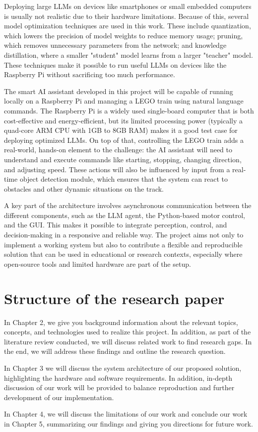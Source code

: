 Deploying large LLMs on devices like smartphones or small embedded computers is usually not realistic due to their hardware limitations. Because of this, several model optimization techniques are used in this work. These include quantization, which lowers the precision of model weights to reduce memory usage; pruning, which removes unnecessary parameters from the network; and knowledge distillation, where a smaller "student" model learns from a larger "teacher" model. These techniques make it possible to run useful LLMs on devices like the Raspberry Pi without sacrificing too much performance.

The smart AI assistant developed in this project will be capable of running locally on a Raspberry Pi and managing a LEGO train using natural language commands. The Raspberry Pi is a widely used single-board computer that is both cost-effective and energy-efficient, but its limited processing power (typically a quad-core ARM CPU with 1GB to 8GB RAM) makes it a good test case for deploying optimized LLMs. On top of that, controlling the LEGO train adds a real-world, hands-on element to the challenge: the AI assistant will need to understand and execute commands like starting, stopping, changing direction, and adjusting speed. These actions will also be influenced by input from a real-time object detection module, which ensures that the system can react to obstacles and other dynamic situations on the track.

A key part of the architecture involves asynchronous communication between the different components, such as the LLM agent, the Python-based motor control, and the GUI. This makes it possible to integrate perception, control, and decision-making in a responsive and reliable way. The project aims not only to implement a working system but also to contribute a flexible and reproducible solution that can be used in educational or research contexts, especially where open-source tools and limited hardware are part of the setup.

%
%
\section{Structure of the research paper}
\label{sec:intro:structure}
In Chapter 2, we give you background information about the relevant topics, concepts, and technologies used to realize this project. In addition, as part of the literature review conducted, we will discuss related work to find research gaps. In the end, we will address these findings and outline the research question. 

In Chapter 3 we will discuss the system architecture of our proposed solution, highlighting the hardware and software requirements. In addition, in-depth discussion of our work will be provided to balance reproduction and further development of our implementation.

In Chapter 4, we will discuss the limitations of our work and conclude our work in Chapter 5, summarizing our findings and giving you directions for future work.
